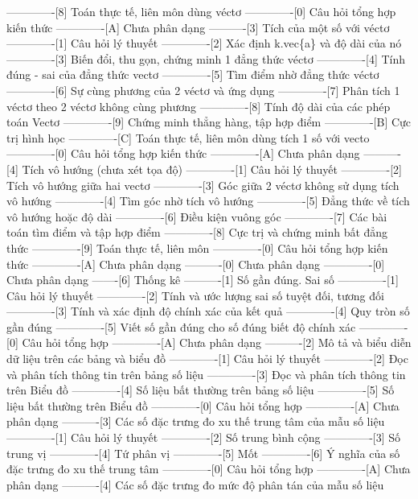-------------[8] Toán thực tế, liên môn dùng véctơ
-------------[0] Câu hỏi tổng hợp kiến thức
-------------[A] Chưa phân dạng
----------[3] Tích của một số với véctơ
-------------[1] Câu hỏi lý thuyết
-------------[2] Xác định k.vec\{a\} và độ dài của nó
-------------[3] Biến đổi, thu gọn, chứng minh 1 đẳng thức véctơ
-------------[4] Tính đúng - sai của đẳng thức vectơ
-------------[5] Tìm điểm nhờ đẳng thức véctơ
-------------[6] Sự cùng phương của 2 véctơ và ứng dụng
-------------[7] Phân tích 1 véctơ theo 2 véctơ không cùng phương
-------------[8] Tính độ dài của các phép toán Vectơ
-------------[9] Chứng minh thẳng hàng, tập hợp điểm
-------------[B] Cực trị hình học
-------------[C] Toán thực tế, liên môn dùng tích 1 số với vecto
-------------[0] Câu hỏi tổng hợp kiến thức
-------------[A] Chưa phân dạng
----------[4] Tích vô hướng (chưa xét tọa độ)
-------------[1] Câu hỏi lý thuyết
-------------[2] Tích vô hướng giữa hai vectơ
-------------[3] Góc giữa 2 véctơ không sử dụng tích vô hướng
-------------[4] Tìm góc nhờ tích vô hướng
-------------[5] Đẳng thức về tích vô hướng hoặc độ dài
-------------[6] Điều kiện vuông góc
-------------[7] Các bài toán tìm điểm và tập hợp điểm
-------------[8] Cực trị và chứng minh bất đẳng thức
-------------[9] Toán thực tế, liên môn
-------------[0] Câu hỏi tổng hợp kiến thức
-------------[A] Chưa phân dạng
----------[0] Chưa phân dạng
-------------[0] Chưa phân dạng
-------[6] Thống kê
----------[1] Số gần đúng. Sai số
-------------[1] Câu hỏi lý thuyết
-------------[2] Tính và ước lượng sai số tuyệt đối, tương đối
-------------[3] Tính và xác định độ chính xác của kết quả
-------------[4] Quy tròn số gần đúng
-------------[5] Viết số gần đúng cho số đúng biết độ chính xác
-------------[0] Câu hỏi tổng hợp
-------------[A] Chưa phân dạng
----------[2] Mô tả và biểu diễn dữ liệu trên các bảng và biểu đồ
-------------[1] Câu hỏi lý thuyết
-------------[2] Đọc và phân tích thông tin trên bảng số liệu
-------------[3] Đọc và phân tích thông tin trên Biểu đồ
-------------[4] Số liệu bất thường trên bảng số liệu
-------------[5] Số liệu bất thường trên Biểu đồ
-------------[0] Câu hỏi tổng hợp
-------------[A] Chưa phân dạng
----------[3] Các số đặc trưng đo xu thế trung tâm của mẫu số liệu
-------------[1] Câu hỏi lý thuyết
-------------[2] Số trung bình cộng
-------------[3] Số trung vị
-------------[4] Tứ phân vị
-------------[5] Mốt
-------------[6] Ý nghĩa của số đặc trưng đo xu thế trung tâm
-------------[0] Câu hỏi tổng hợp
-------------[A] Chưa phân dạng
----------[4] Các số đặc trưng đo mức độ phân tán của mẫu số liệu
